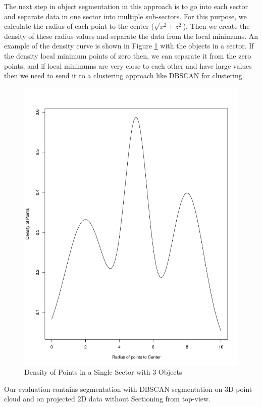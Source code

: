 The next step in object segmentation in this approach is to go into each sector and separate data in one sector into multiple sub-sectors.
For this purpose, we calculate the radius of each point to the center ($\sqrt{x^2 + z^2 } $). Then we create the density of these radius values and separate the data from the local minimums.  An example of the density curve is shown in Figure \ref{fig:SectorDensity} with the objects in a sector. If the density local minimum points of zero then, we can separate it from the zero points, and if local minimums are very close to each other and have large values then we need to send it to a clustering approach like DBSCAN for clustering.

\begin{figure}[!h]
\begin{center}
  \includegraphics[scale=0.2]{./images/sectors_density.pdf}
  \caption{Density of Points in a Single Sector with 3 Objects}
  \label{fig:SectorDensity}
\end{center}
\end{figure}


Our evaluation contains segmentation with DBSCAN segmentation on 3D point cloud and on projected 2D data without Sectioning from top-view.
